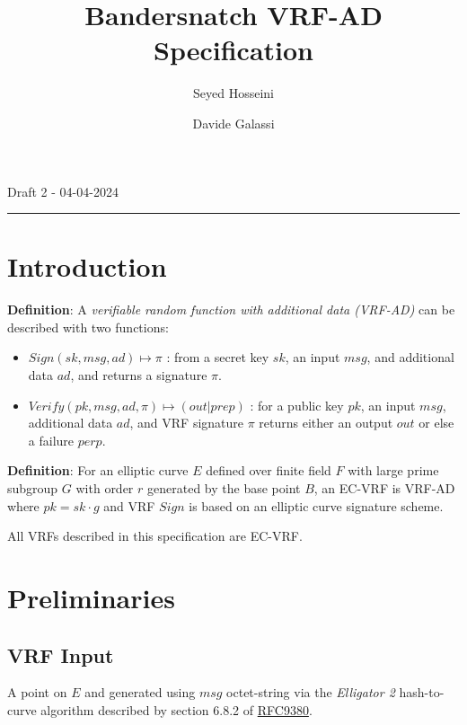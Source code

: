 \documentclass[
]{article}
\title{Bandersnatch VRF-AD Specification}
\author{Seyed Hosseini \and Davide Galassi}
\date{}
\providecommand{\tightlist}{%
  \setlength{\itemsep}{0pt}\setlength{\parskip}{0pt}}
\begin{document}
\maketitle

Draft 2 - 04-04-2024

\begin{center}\rule{0.5\linewidth}{0.5pt}\end{center}

\hypertarget{introduction}{%
\section{Introduction}\label{introduction}}

\textbf{Definition}: A \emph{verifiable random function with additional
data (VRF-AD)} can be described with two functions:

\begin{itemize}
\tightlist
\item
  \(Sign(sk,msg,ad) \mapsto \pi\) : from a secret key \(sk\), an input
  \(msg\), and additional data \(ad\), and returns a signature \(\pi\).
\item
  \(Verify(pk,msg,ad,\pi) \mapsto (out|prep)\) : for a public key
  \(pk\), an input \(msg\), additional data \(ad\), and VRF signature
  \(\pi\) returns either an output \(out\) or else a failure \(perp\).
\end{itemize}

\textbf{Definition}: For an elliptic curve \(E\) defined over finite
field \(F\) with large prime subgroup \(G\) with order \(r\) generated
by the base point \(B\), an EC-VRF is VRF-AD where \(pk = sk \cdot g\)
and VRF \(Sign\) is based on an elliptic curve signature scheme.

All VRFs described in this specification are EC-VRF.

\hypertarget{preliminaries}{%
\section{Preliminaries}\label{preliminaries}}

\hypertarget{vrf-input}{%
\subsection{VRF Input}\label{vrf-input}}

A point on \(E\) and generated using \(msg\) octet-string via the
\emph{Elligator 2} hash-to-curve algorithm described by section 6.8.2 of
\href{https://datatracker.ietf.org/doc/rfc9380/}{RFC9380}.
\end{document}

